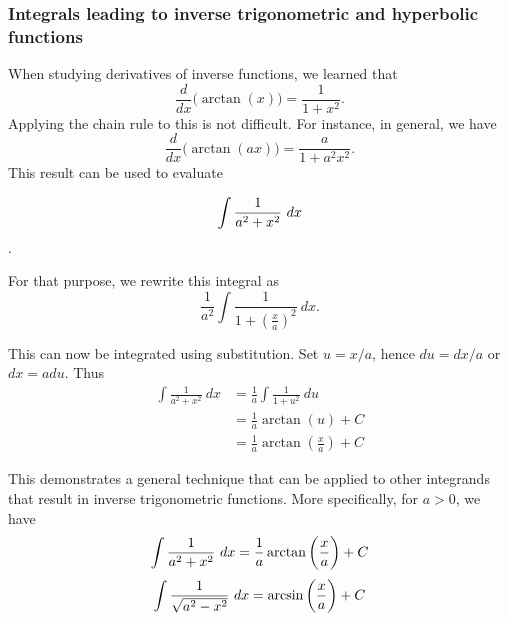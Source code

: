 \subsubsection{Integrals leading to inverse trigonometric \ifanalysis and hyperbolic \fi functions}
When studying derivatives of inverse functions, we learned that
$$\frac{d}{dx}\big(\arctan(x)\big) = \frac{1}{1+x^2}.$$
Applying the chain rule to this is not difficult. For instance, in general, we have
$$\frac{d}{dx}\big(\arctan(ax)\big) = \frac{a}{1+a^2x^2}.$$
This result can be used to evaluate

$$\ds \int \frac{1}{a^2+x^2}\ dx$$.

For that purpose, we rewrite this integral as 
$$
\frac{1}{a^2}\int \frac{1}{1+\left(\frac{x}{a}\right)^2}\ dx.$$

This can now be integrated using substitution. Set $u = x/a$, hence $du = dx/a$ or $dx=adu$. Thus
\begin{align*}
\int\frac{1}{a^2+x^2}\ dx &= \frac{1}{a}\int \frac{1}{1+u^2}\ du \\
										&= \frac{1}{a}\arctan(u) + C \\
										&= \frac{1}{a}\arctan\left(\frac{x}{a}\right)+C
\end{align*}


This demonstrates a general technique that can be applied to other integrands that result in inverse trigonometric functions. More specifically, for $a>0$, we have
	\begin{equation}\displaystyle \int \frac{1}{a^2+x^2}\ dx = \frac1a\arctan\left(\frac{x}{a}\right) + C\label{arctan_direct}\end{equation}
		\begin{equation}\displaystyle \int \frac{1}{\sqrt{a^2-x^2}}\ dx = \arcsin\left(\frac{x}{a}\right)+C\label{arcsin_direct}\end{equation}


\ifanalysis


